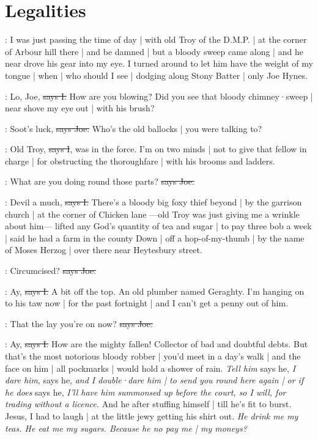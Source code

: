 \section{Legalities}

\Nq:
I was just passing the time of day |
with old Troy of the D.M.P. |
at the corner of Arbour hill there |
and be damned |
but a bloody sweep came along |
and he near drove his gear into my eye.
I turned around
to let him have the weight of my tongue |
when |
who should I see |
dodging along Stony Batter |
only Joe Hynes.

:
Lo,
Joe,
\sout{says I.}
How are you blowing?
Did you see that bloody chimney·sweep |
near shove my eye out |
with his brush?

\joe:
Soot's luck,
\sout{says Joe.}
Who's the old ballocks |
you were talking to?

:
Old Troy,
\sout{says I},
was in the force.
I'm on two minds |
not to give that fellow in charge |
for obstructing the thoroughfare
 |
with his brooms and ladders.

\joe:
What are you doing round those parts?
\sout{says Joe.}

:
Devil a much,
\sout{says I.}
There's a bloody big foxy thief beyond |
by the garrison church |
at the corner of Chicken lane%
—old Troy was just giving me a wrinkle about him—%
lifted any God's quantity of tea and sugar |
to pay three bob a week |
said he had a farm in the county Down |
off a hop-of-my-thumb |
by the name of Moses Herzog |
over there near Heytesbury street.

\joe:
Circumcised?
\sout{says Joe.}

:
Ay,
\sout{says I.}
A bit off the top.
An old plumber named Geraghty.
I'm hanging on to his taw now |
for the past fortnight |
and I can't get a penny out of him.

\joe:
That the lay you're on now?
\sout{says Joe.}

:
Ay,
\sout{says I.}
How are the mighty fallen!
Collector of bad and doubtful debts.
But that's the most notorious bloody robber |
you'd meet in a day's walk |
and the face on him |
all pockmarks |
would hold a shower of rain.
\emph{Tell him}
says he,
\emph{I dare him},
says he,
\emph{and I double·dare him |
to send you round here again |
or if he does}
says he,
\emph{I'll have him summonsed up before the court,
so I will,
for trading without a licence.}
And he after stuffing himself |
till he's fit to burst.
Jesus,
I had to laugh |
at the little jewy getting his shirt out.
\emph{He drink me my teas.
He eat me my sugars.
Because he no pay me |
my moneys?}


